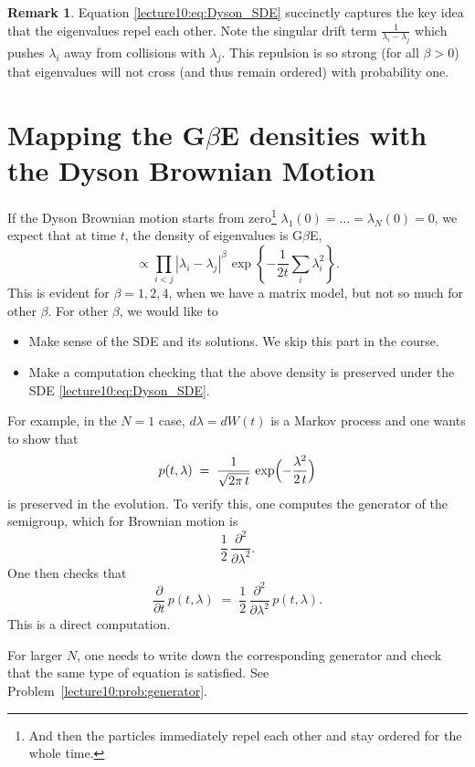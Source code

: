 \documentclass[letterpaper,11pt,oneside,reqno]{book}
\numberwithin{equation}{chapter}  %
\newcommand{\ssp}{\hspace{1pt}}
\theoremstyle{definition}
\newtheorem{remark}[proposition]{Remark}
\begin{document}
\begin{remark}
	Equation \eqref{lecture10:eq:Dyson_SDE} succinctly captures the key idea that the eigenvalues repel each other. Note the singular drift term $\frac{1}{\lambda_i-\lambda_j}$ which pushes $\lambda_i$ away from collisions with $\lambda_j$. This repulsion is so strong (for all $\beta>0$)
	that eigenvalues will not cross (and thus remain ordered) with probability one.
\end{remark}

\section{Mapping the G\texorpdfstring{\(\beta\)}{beta}E densities with the Dyson Brownian Motion}

If the Dyson Brownian motion starts from zero\footnote{And then the particles immediately
repel each other and stay ordered for the whole time.}
$\lambda_1(0)=\dots=\lambda_N(0)=0$,
we expect that at time $t$, the density of eigenvalues
is G$\beta$E,
\begin{equation*}
	\propto \prod_{i<j}|\lambda_i-\lambda_j|^{\beta}\ssp
	\exp\left\{ -\frac{1}{2t}\sum_{i}\lambda_i^2 \right\}.
\end{equation*}
This is evident for $\beta=1,2,4$, when we have a matrix model, but not so
much for other $\beta$. For other $\beta$, we would like to
\begin{itemize}
\item Make sense of the SDE and its solutions. We skip this part in the course.
\item Make a computation checking that the above density is preserved under the SDE
\eqref{lecture10:eq:Dyson_SDE}.
\end{itemize}

For example,
in the $N=1$ case, $d\lambda = dW(t)$ is a Markov process and one wants to show that
\[
p(t,\lambda) \;=\; \frac{1}{\sqrt{2\pi\,t}}\,
\exp\Bigl(-\frac{\lambda^{2}}{2\,t}\Bigr)
\]
is preserved in the evolution.  To verify this, one computes the generator
of the semigroup, which for Brownian motion is
\[
\frac{1}{2}\,\frac{\partial^{2}}{\partial\lambda^{2}}.
\]
One then checks that
\[
\frac{\partial}{\partial t}\,p(t,\lambda)
\;=\;
\frac{1}{2}\,\frac{\partial^{2}}{\partial\lambda^{2}}\,p(t,\lambda).
\]
This is a direct computation.

For larger $N$, one needs to write down the corresponding generator and check
that the same type of equation is satisfied.
See Problem~\ref{lecture10:prob:generator}.
\end{document}
